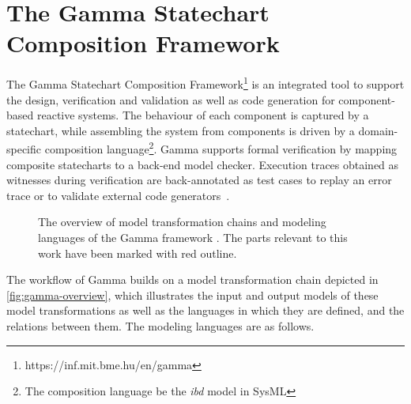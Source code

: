 \section{The Gamma Statechart Composition Framework}\label{sec:gamma}

The Gamma Statechart Composition Framework\footnote{https://inf.mit.bme.hu/en/gamma} \cite{mixed_statecharts_2020} is an integrated tool to support the design, verification and validation as well as code generation for component-based reactive systems. The behaviour of each component is captured by a statechart, while assembling the system from components is driven by a domain-specific composition language\footnote{The composition language be the \emph{ibd} model in SysML}. Gamma supports formal verification by mapping composite statecharts to a back-end model checker. Execution traces obtained as witnesses during verification are back-annotated as test cases to replay an error trace or to validate external code generators~\cite{molnar2018gamma}. 

\begin{figure}[!ht]
	\centering
	
	\caption{The overview of model transformation chains and modeling languages of the Gamma framework \cite{mixed_statecharts_2020}. The parts relevant to this work have been marked with red outline.}
	\label{fig:gamma-overview}
\end{figure}

The workflow of Gamma builds on a model transformation chain depicted in \autoref{fig:gamma-overview}, which illustrates the input and output models of these model transformations as well as the languages in which they are defined, and the relations between them. The modeling languages are as follows.

